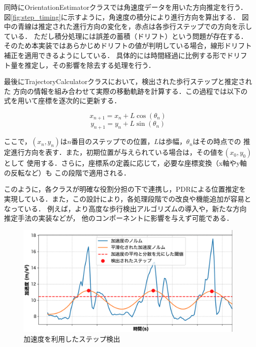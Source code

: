 同時にOrientationEstimatorクラスでは角速度データを用いた方向推定を行う．
図\ref{fig:step_timing}に示すように，角速度の積分により進行方向を算出する．
図中の青線は推定された進行方向の変化を，赤点は各歩行ステップでの方向を示している．
ただし積分処理には誤差の蓄積（ドリフト）という問題が存在する．
そのため本実装ではあらかじめドリフトの値が判明している場合，線形ドリフト補正を適用できるようにしている．
具体的には時間経過に比例する形でドリフト量を推定し，その影響を除去する処理を行う．

最後にTrajectoryCalculatorクラスにおいて，検出された歩行ステップと推定された
方向の情報を組み合わせて実際の移動軌跡を計算する．この過程では以下の式を用いて座標を逐次的に更新する．

\begin{equation}
x_{n+1} = x_n + L \cos(\theta_n)
\end{equation}
\begin{equation}
y_{n+1} = y_n + L \sin(\theta_n)
\end{equation}

ここで，$(x_n, y_n)$は$n$番目のステップでの位置，$L$は歩幅，$\theta_n$はその時点での
推定進行方向を表す．また，初期位置が与えられている場合は，その値を$(x_0, y_0)$として
使用する．さらに，座標系の定義に応じて，必要な座標変換（x軸やy軸の反転など）も
この段階で適用される．

このように，各クラスが明確な役割分担の下で連携し，PDRによる位置推定を
実現している．また，この設計により，各処理段階での改良や機能追加が容易となっている．
例えば，より高度な歩行検出アルゴリズムの導入や，新たな方向推定手法の実装などが，
他のコンポーネントに影響を与えず可能である．


\begin{figure}[H]
	\centering
	\includegraphics[width=\linewidth]{../image/step_detect.jpg}
	\caption{加速度を利用したステップ検出}    \label{fig:step_detect}
\end{figure}


